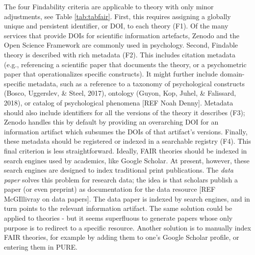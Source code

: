 \documentclass[
  man,floatsintext]{apa6}
\begin{document}
The four Findability criteria are applicable to theory with only minor adjustments, see Table \ref{tab:tabfair}.
First, this requires assigning a globally unique and persistent identifier, or DOI, to each theory (F1).
Of the many services that provide DOIs for scientific information artefacts,
Zenodo and the Open Science Framework are commonly used in psychology.
Second, Findable theory is described with rich metadata (F2).
This includes citation metadata (e.g., referencing a scientific paper that documents the theory, or a psychometric paper that operationalizes specific constructs).
It might further include domain-specific metadata, such as a reference to a taxonomy of psychological constructs (Bosco, Uggerslev, \& Steel, 2017),
ontology (Guyon, Kop, Juhel, \& Falissard, 2018),
or catalog of psychological phenomena {[}REF Noah Denny{]}.
Metadata should also include identifiers for all the versions of the theory it describes (F3);
Zenodo handles this by default by providing an overarching DOI for an information artifact which subsumes the DOIs of that artifact's versions.
Finally, these metadata should be registered or indexed in a searchable registry (F4).
This final criterion is less straightforward.
Ideally, FAIR theories should be indexed in search engines used by academics, like Google Scholar.
At present, however, these search engines are designed to index traditional print publications.
The \emph{data paper} solves this problem for research data;
the idea is that scholars publish a paper (or even preprint) as documentation for the data resource {[}REF McGIllivray on data papers{]}.
The data paper is indexed by search engines, and in turn points to the relevant information artifact.
The same solution could be applied to theories - but it seems superfluous to generate papers whose only purpose is to redirect to a specific resource.
Another solution is to manually index FAIR theories,
for example by adding them to one's Google Scholar profile,
or entering them in PURE.
\end{document}
